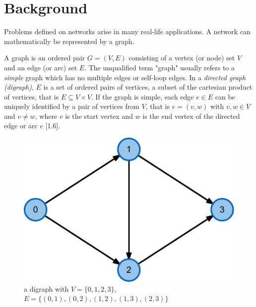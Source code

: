 \chapter{Background}\label{ch:2}
Problems defined on networks arise in many real-life applications. A network can mathematically be represented by a graph. 

\newcommand{\Ein}[1]{\delta^-(#1)}
\newcommand{\Eout}[1]{\delta^+(#1)}
\newcommand{\ein}{{e_{\text{in}}}}
\newcommand{\eout}{{e_{\text{out}}}}

\newcommand{\setfont}[1]{#1}

\begin{definition}
A graph is an ordered pair $G = (V, E)$ consisting of a vertex (or node) set $V$ and an edge (or arc) set $E$. The unqualified term "graph" usually refers to a \textit{simple} graph which has no multiple edges or self-loop edges. In a \textit{directed graph (digraph)}, $E$ is a set of ordered pairs of vertices, a subset of the cartesian product of vertices, that is $E \subseteq V \times V$. If the graph is simple, each edge $e \in E$ can be uniquely identified by a pair of vertices from $V$, that is $e=(v,w)$ with $v,w \in V$ and $v \neq w$, where $v$ is the start vertex and $w$ is the end vertex of the directed edge or arc $e$ \cite{jungnickel2013graphs}[1.6]. \end{definition}

\begin{figure}
\centering
	\includegraphics{fig/graph-editor}
	\caption{a digraph with $V=\{0,1,2,3\}$, $E=\{(0,1),(0,2),(1,2),(1,3),(2,3)\}$}
	\label{fig:graph}
\end{figure}

